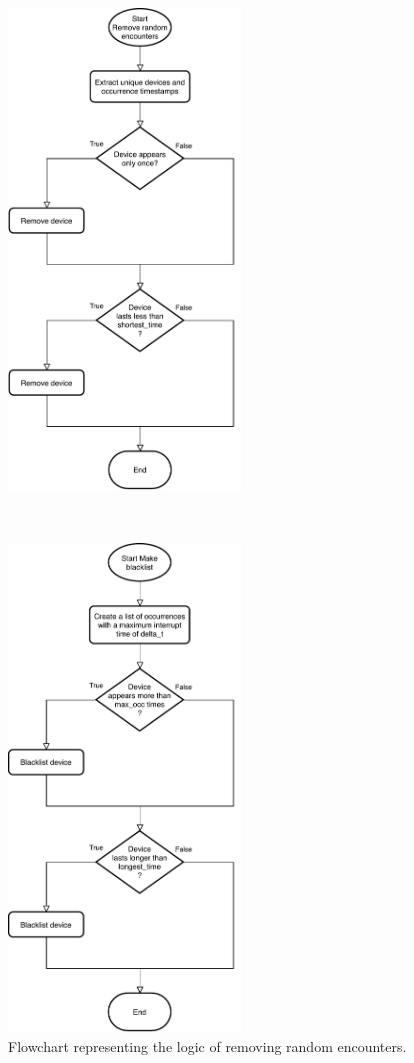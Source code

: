 \begin{figure}
\begin{minipage}[b]{8.5cm}
\centering
\includegraphics[width=0.55\textwidth]{images/flowrandom}
\caption{Flowchart representing the logic of removing random encounters.}
\label{fig:flowrandom}
\end{minipage}
\ \hspace{2mm} \hspace{3mm} \
\begin{minipage}[b]{8.5cm}
\centering
\includegraphics[width=0.55\textwidth]{images/flowblacklist}

\end{minipage}
\end{figure}
